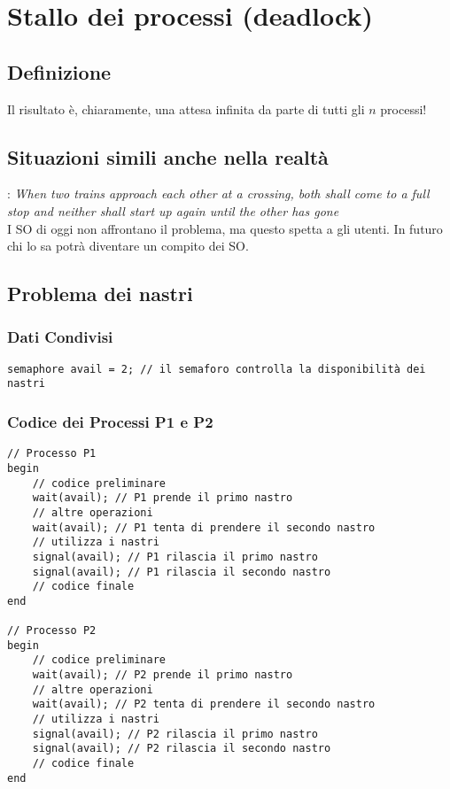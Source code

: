 \chapter{Stallo dei processi (deadlock)}

\section{Definizione}
Il risultato è, chiaramente, una attesa infinita da parte di tutti gli $n$ processi!

\section{Situazioni simili anche nella realtà}:
\textit{When two trains approach each other at a crossing, both shall come to a full stop and neither shall start up again until the other has gone}\\
I SO di oggi non affrontano il problema, ma questo spetta a gli utenti. In futuro chi lo sa potrà diventare un compito dei SO.

\section{Problema dei nastri}
\subsection{Dati Condivisi}
\begin{verbatim}
semaphore avail = 2; // il semaforo controlla la disponibilità dei nastri
\end{verbatim}
\subsection{Codice dei Processi P1 e P2}

\begin{verbatim}
// Processo P1
begin
    // codice preliminare
    wait(avail); // P1 prende il primo nastro
    // altre operazioni
    wait(avail); // P1 tenta di prendere il secondo nastro
    // utilizza i nastri
    signal(avail); // P1 rilascia il primo nastro
    signal(avail); // P1 rilascia il secondo nastro
    // codice finale
end

// Processo P2
begin
    // codice preliminare
    wait(avail); // P2 prende il primo nastro
    // altre operazioni
    wait(avail); // P2 tenta di prendere il secondo nastro
    // utilizza i nastri
    signal(avail); // P2 rilascia il primo nastro
    signal(avail); // P2 rilascia il secondo nastro
    // codice finale
end
\end{verbatim}

